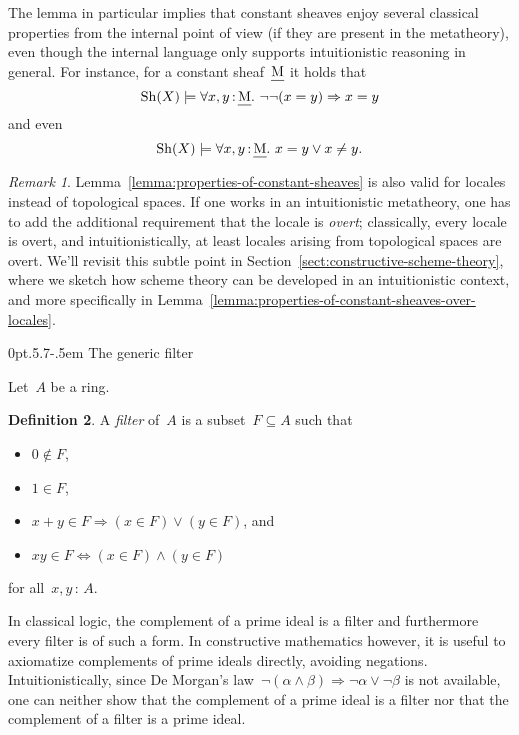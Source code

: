 \documentclass[10pt,reqno,a4paper]{amsbook}
\makeatletter
\theoremstyle{definition}
\newtheorem{defn}{Definition}[section]
\theoremstyle{plain}
\theoremstyle{remark}
\newtheorem{rem}[defn]{Remark}
\let\oldul\ul
\renewcommand{\ul}[1]{\text{\oldul{$#1$}}}
\newcommand{\Sh}{\mathrm{Sh}}
\newcommand{\?}{\,{:}\,}
\renewcommand{\_}{\mathpunct{.}\,}
\def\subsection{\@startsection{subsection}{2}%
  {0pt}{.5\linespacing\@plus.7\linespacing}{-.5em}%
  {\normalfont\bfseries}}
\makeatother
\begin{document}
The lemma in particular implies that constant sheaves enjoy several
classical properties from the internal point of view (if they are present in the metatheory), even though the internal
language only supports intuitionistic reasoning in general. For instance, for a
constant sheaf~$\ul{M}$ it holds that
\[ \Sh(X) \models \forall x,y\?\ul{M}\_ \neg\neg(x = y) \Rightarrow x = y \]
and even
\[ \Sh(X) \models \forall x,y\?\ul{M}\_ x = y \vee x \neq y. \]

\begin{rem}Lemma~\ref{lemma:properties-of-constant-sheaves} is also valid for
locales instead of topological spaces. If one works in an intuitionistic
metatheory, one has to add the additional requirement that the locale is
\emph{overt}; classically, every locale is overt, and intuitionistically,
at least locales arising from topological spaces are overt. We'll revisit this
subtle point in Section~\ref{sect:constructive-scheme-theory}, where we sketch
how scheme theory can be developed in an intuitionistic context, and more
specifically in Lemma~\ref{lemma:properties-of-constant-sheaves-over-locales}.
\end{rem}


\subsection{The generic filter}
\label{sect:generic-filter}

Let~$A$ be a ring.

\begin{defn}\label{defn:filter}
A \emph{filter} of~$A$ is a subset~$F \subseteq A$ such that
\begin{itemize}
\item $0 \not\in F$,
\item $1 \in F$,
\item $x + y \in F \Longrightarrow (x \in F) \vee (y \in F)$, and
\item $xy \in F \Longleftrightarrow (x \in F) \wedge (y \in F)$
\end{itemize}
for all~$x,y \? A$.
\end{defn}

In classical logic, the complement of a prime ideal is a filter and
furthermore every filter is of such a form. In constructive mathematics however,
it is useful to axiomatize complements of prime ideals directly, avoiding
negations. Intuitionistically, since De Morgan's law~$\neg(\alpha \wedge \beta)
\Rightarrow \neg\alpha \vee \neg\beta$ is not available, one can neither show
that the complement of a prime ideal is a filter nor that the complement of a
filter is a prime ideal.
\end{document}
